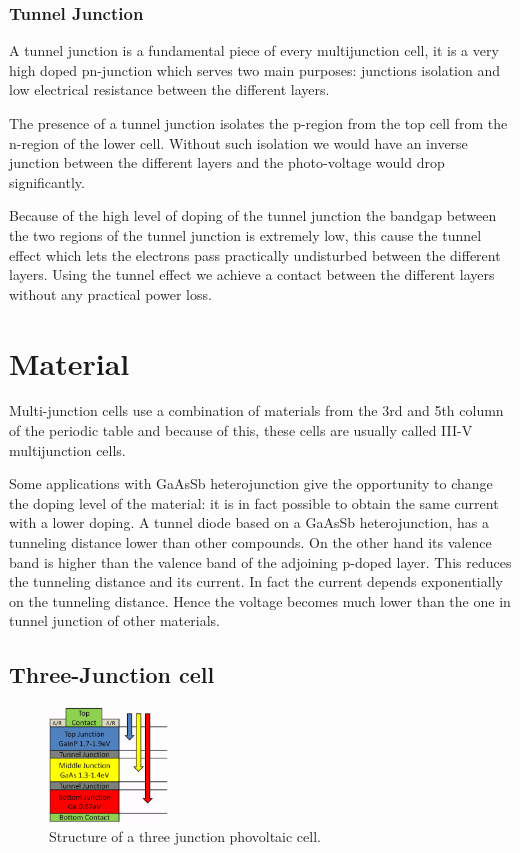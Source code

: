 \documentclass[11pt]{article} %
\begin{document}
\subsubsection{Tunnel Junction}

A tunnel junction is a fundamental piece of every multijunction cell, it is a very high doped pn-junction which serves two main purposes: junctions isolation and low electrical resistance between the different layers.  

The presence of a tunnel junction isolates the p-region from the top cell from the n-region of the lower cell.  Without such isolation we would have an inverse junction between the different layers and the photo-voltage would drop significantly.  

Because of the high level of doping of the tunnel junction the bandgap between the two regions of the tunnel junction is extremely low, this cause the tunnel effect which lets the electrons pass practically undisturbed between the different layers.  Using the tunnel effect we achieve a contact between the different layers without any practical power loss.


\section{Material}

Multi-junction cells use a combination of materials from the 3rd  and 5th column of the periodic table and because of this, these cells are usually called III-V multijunction cells.

Some applications with GaAsSb heterojunction give the opportunity to change the doping level of the material: it is in fact possible to obtain the same current with a lower doping. A tunnel diode based on a GaAsSb heterojunction, has a tunneling distance lower than other compounds. On the other hand its valence band is higher than the valence band of the adjoining p-doped layer. This reduces the tunneling distance and its current. In fact the current depends exponentially on the tunneling distance. Hence the voltage becomes much lower than the one in tunnel junction of other materials.  

\subsection{Three-Junction cell}

\begin{figure}
	\centering
	\includegraphics[width=0.28\textwidth]{img/f2big.png}
	\caption{Structure of a three junction phovoltaic cell.}
\end{figure}
\end{document}
